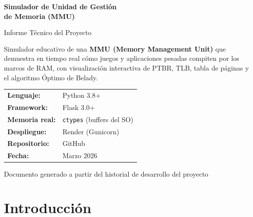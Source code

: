 \documentclass[12pt,a4paper]{article}
\begin{document}
\begin{titlepage}
  \centering
  \vspace*{2cm}

  {\Huge\bfseries Simulador de Unidad de Gestión\\[0.3em]
  de Memoria (MMU)\par}

  \vspace{0.5cm}
  {\large\color{gray} Informe Técnico del Proyecto\par}

  \vspace{2cm}

  \begin{mdframed}[linecolor=accent,linewidth=1.5pt,leftmargin=2cm,rightmargin=2cm]
    \centering\vspace{0.3cm}
    {\normalsize Simulador educativo de una \textbf{MMU (Memory Management Unit)} que
    demuestra en tiempo real cómo juegos y aplicaciones pesadas compiten
    por los marcos de RAM, con visualización interactiva de PTBR, TLB,
    tabla de páginas y el algoritmo Óptimo de Belady.}
    \vspace{0.3cm}
  \end{mdframed}

  \vspace{2cm}

  \begin{tabular}{ll}
    \textbf{Lenguaje:}    & Python 3.8+ \\[4pt]
    \textbf{Framework:}   & Flask 3.0+ \\[4pt]
    \textbf{Memoria real:}& \texttt{ctypes} (buffers del SO) \\[4pt]
    \textbf{Despliegue:}  & Render (Gunicorn) \\[4pt]
    \textbf{Repositorio:} & GitHub \\[4pt]
    \textbf{Fecha:}       & Marzo 2026 \\
  \end{tabular}

  \vfill
  {\small Documento generado a partir del historial de desarrollo del proyecto}
\end{titlepage}

\tableofcontents
\newpage

\section{Introducción}
\end{document}
